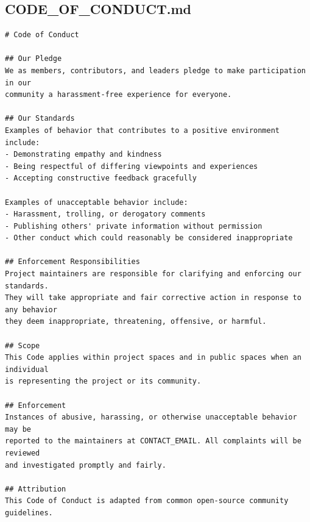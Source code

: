 \documentclass[11pt,letterpaper]{article}
\begin{document}
\subsection{CODE\_OF\_CONDUCT.md}
\begin{verbatim}
# Code of Conduct

## Our Pledge
We as members, contributors, and leaders pledge to make participation in our
community a harassment-free experience for everyone.

## Our Standards
Examples of behavior that contributes to a positive environment include:
- Demonstrating empathy and kindness
- Being respectful of differing viewpoints and experiences
- Accepting constructive feedback gracefully

Examples of unacceptable behavior include:
- Harassment, trolling, or derogatory comments
- Publishing others' private information without permission
- Other conduct which could reasonably be considered inappropriate

## Enforcement Responsibilities
Project maintainers are responsible for clarifying and enforcing our standards.
They will take appropriate and fair corrective action in response to any behavior
they deem inappropriate, threatening, offensive, or harmful.

## Scope
This Code applies within project spaces and in public spaces when an individual
is representing the project or its community.

## Enforcement
Instances of abusive, harassing, or otherwise unacceptable behavior may be
reported to the maintainers at CONTACT_EMAIL. All complaints will be reviewed
and investigated promptly and fairly.

## Attribution
This Code of Conduct is adapted from common open-source community guidelines.
\end{verbatim}
\clearpage
\end{document}
